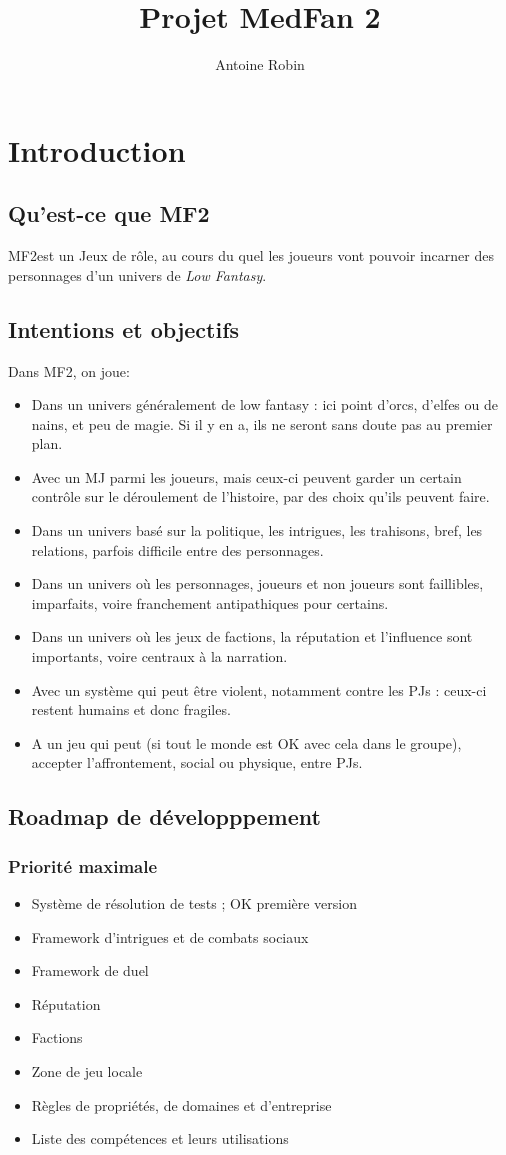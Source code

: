 \documentclass[10pt,a4paper]{book}
\author{ Antoine Robin}
\title{Projet MedFan 2}
\newcommand{\titre}{MF2}
\begin{document}
\maketitle
\tableofcontents
\chapter*{Introduction}
\section*{Qu'est-ce que \titre}
\titre est un Jeux de rôle, au cours du quel les joueurs vont pouvoir incarner des personnages d'un univers de \emph{Low Fantasy}. 
\section*{Intentions et objectifs}
Dans \titre, on joue:
\begin{itemize}
\item Dans un univers généralement de low fantasy : ici point d'orcs, d'elfes ou de nains, et peu de magie. Si il y en a, ils ne seront sans doute pas au premier plan.
\item Avec un MJ parmi les joueurs, mais ceux-ci peuvent garder un certain contrôle sur le déroulement de l'histoire, par des choix qu'ils peuvent faire.
\item Dans un univers basé sur la politique, les intrigues, les trahisons, bref, les relations, parfois difficile entre des personnages.
\item Dans un univers où les personnages, joueurs et non joueurs sont faillibles, imparfaits, voire franchement antipathiques pour certains.
\item Dans un univers où les jeux de factions, la réputation et l'influence sont importants, voire centraux à la narration.
\item Avec un système qui peut être violent, notamment contre les PJs : ceux-ci restent humains et donc fragiles.
\item A un jeu qui peut (si tout le monde est OK avec cela dans le groupe), accepter l'affrontement, social ou physique, entre PJs.
\end{itemize}
\section*{Roadmap de développpement}
\subsection*{Priorité maximale}
\begin{itemize}
\item Système de résolution de tests ; OK première version
\item Framework d'intrigues et de combats sociaux
\item Framework de duel
\item Réputation
\item Factions
\item Zone de jeu locale
\item Règles de propriétés, de domaines et d'entreprise
\item Liste des compétences et leurs utilisations
\end{itemize}
\end{document}
